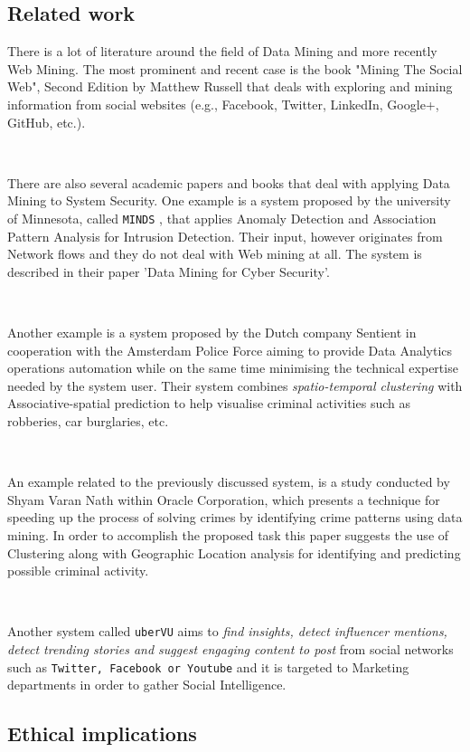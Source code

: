 \documentclass[12pt]{article}
\begin{document}
\subsection{Related work}
\parbox{\linewidth}{
There is a lot of literature around the field of Data Mining and more recently Web Mining. The most prominent and recent case is the book "Mining The Social Web", Second Edition by Matthew Russell \cite{socialweb} that deals with exploring and mining information from social websites (e.g., Facebook, Twitter, LinkedIn, Google+, GitHub, etc.). 
}
\hfill \break \\
\parbox{\linewidth}{
There are also several academic papers and books that deal with applying Data Mining to System Security. One example is a system proposed by the university of Minnesota, called \texttt{MINDS}  \cite{minds}, that applies Anomaly Detection and Association Pattern Analysis for Intrusion Detection. Their input, however originates from Network flows and they do not deal with Web mining at all. The system is described in their paper 'Data Mining for Cyber Security'.
} 
\hfill \break \\
\parbox{\linewidth}{
Another example is a system proposed by the Dutch company Sentient in cooperation with the Amsterdam Police Force \cite{police} aiming to provide Data Analytics operations automation while on the same time minimising the technical expertise needed by the system user. Their system combines \textit{spatio-temporal clustering} with {Associative-spatial prediction} to help visualise criminal activities such as robberies, car burglaries, etc. 
}
\hfill \break \\
\parbox{\linewidth}{
An example related to the previously discussed system, is a study conducted by Shyam Varan Nath within Oracle Corporation\cite{oracle}, which presents a technique for speeding up the process of solving crimes \cite{pattern-police} by identifying crime patterns using data mining. In order to accomplish the proposed task this paper suggests the use of Clustering along with Geographic Location analysis for identifying and predicting possible criminal activity. 
}
\hfill \break \\
\parbox{\linewidth}{
Another system called \texttt{uberVU} aims to \textit{find insights, detect influencer mentions, detect trending stories and suggest engaging content to post}\cite{ubervu} from social networks such as \texttt{Twitter, Facebook or Youtube} and it is targeted to Marketing departments in order to gather Social Intelligence.  
}
\newpage
\subsection{Ethical implications}
\end{document}
